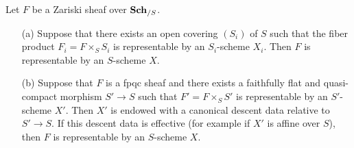 \begin{lemma}\label{scheme Zariski functor representable by descent lemma}
Let $F$ be a Zariski sheaf over $\mathbf{Sch}_{/S}$.
\begin{enumerate}
    \item[(a)] Suppose that there exists an open covering $(S_i)$ of $S$ such that the fiber product $F_i=F\times_SS_i$ is representable by an $S_i$-scheme $X_i$. Then $F$ is representable by an $S$-scheme $X$.
    \item[(b)] Suppose that $F$ is a fpqc sheaf and there exists a faithfully flat and quasi-compact morphism $S'\to S$ such that $F'=F\times_SS'$ is representable by an $S'$-scheme $X'$. Then $X'$ is endowed with a canonical descent data relative to $S'\to S$. If this descent data is effective (for example if $X'$ is affine over $S$), then $F$ is representable by an $S$-scheme $X$.
\end{enumerate}
\end{lemma}
